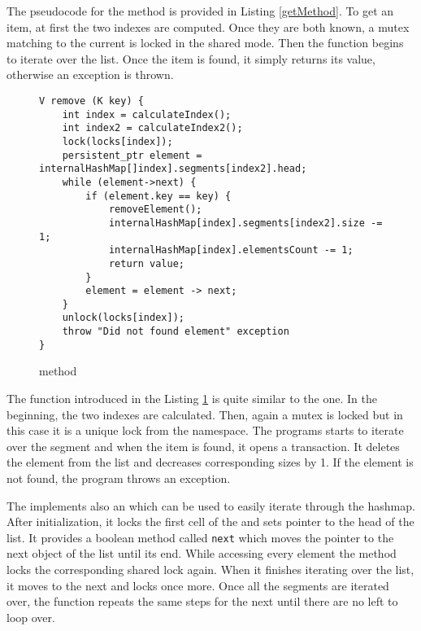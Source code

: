         The pseudocode for the \getMethod method is provided in Listing \ref{getMethod}. 
        To get an item, at first the two indexes are computed. 
        Once they are both known, a mutex matching to the current \internalHashMap is locked in the shared mode. 
        Then the function begins to iterate over the list. 
        Once the item is found, it simply returns its value, otherwise an exception is thrown.
        
\begin{figure}[ht]
\renewcommand{\figurename}{Listing}
\begin{lstlisting}
V remove (K key) {
    int index = calculateIndex();
    int index2 = calculateIndex2();
    lock(locks[index]);
    persistent_ptr element = internalHashMap[]index].segments[index2].head;
    while (element->next) {
        if (element.key == key) {
            removeElement();
            internalHashMap[index].segments[index2].size -= 1;
            internalHashMap[index].elementsCount -= 1;
            return value;
        }
        element = element -> next;
    } 
    unlock(locks[index]);
    throw "Did not found element" exception
}
\end{lstlisting}
\caption{\removeMethod method}
\label{removeMethod}
\end{figure}

        The \removeMethod function introduced in the Listing \ref{removeMethod} is quite similar to the \getMethod one. 
        In the beginning, the two indexes are calculated. 
        Then, again a mutex is locked but in this case it is a unique lock \cite{UniqueLock} from the \std namespace.
        The programs starts to iterate over the segment and when the item is found, it opens a transaction. 
        It deletes the element from the list and decreases corresponding sizes by 1.
        If the element is not found, the program throws an exception.

        The \NvmHashMap implements also an \Iterator which can be used to easily iterate through the hashmap.
        After initialization, it locks the first cell of the \internalHashMap and sets pointer to the head of the list.
        It provides a boolean method called \texttt{next} which moves the pointer to the next object of the list until its end. 
        While accessing every element the method locks the corresponding shared lock again. 
        When it finishes iterating over the list, it moves to the next \Segment and locks once more. 
        Once all the segments are iterated over, the function repeats the same steps for the next \internalHashMap until there are no left to loop over.
        
